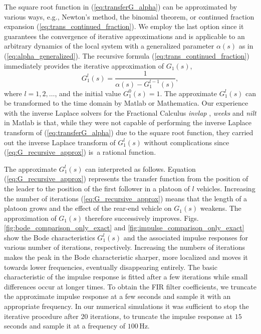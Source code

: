 \documentclass[final,5p,times,twocolumn]{elsarticle}
\begin{document}
The square root function in (\ref{eq:transferG_alpha}) can be approximated by various ways, e.g., Newton's method, the binomial theorem, or continued fraction expansion (\ref{eq:trans_continued_fraction}). We employ the last option since it guarantees the convergence of iterative approximations and is applicable to an arbitrary dynamics of the local system with a generalized parameter $\alpha(s)$ as in (\ref{eq:alpha_generalized}). The recursive formula (\ref{eq:trans_continued_fraction}) immediately provides the iterative approximation of $G_1(s)$,
\begin{equation}
  G_1^l(s) = \frac{1}{\alpha(s)-G_1^{l-1}(s)},
  \label{eq:G_recursive_approx}
\end{equation}
where $l = 1,2,\ldots $, and the initial value $G_1^0(s) = 1$. The approximate $G_1^l(s)$ can be transformed to the time domain by Matlab or Mathematica. Our experience with the inverse Laplace solvers for the Fractional Calculus \emph{invlap} \cite{dehoog1982}, \emph{weeks} \cite{Weeks1966} and \emph{nilt} \cite{brancik1999} in Matlab is that, while they were not capable of performing the inverse Laplace transform of (\ref{eq:transferG_alpha}) due to the square root function, they carried out the inverse Laplace transform of $G_{1}^l(s)$ without complications since (\ref{eq:G_recursive_approx}) is~a rational function.

The approximate $G_1^l(s)$ can interpreted as follows. Equation (\ref{eq:G_recursive_approx}) represents the transfer function from the position of the leader to the position of the first follower in a platoon of $l$ vehicles. Increasing the number of iterations (\ref{eq:G_recursive_approx}) means that the length of a platoon grows and the effect of the rear-end vehicle on $G_1(s)$ weakens. The approximation of $G_1(s)$ therefore successively improves. Figs. \ref{fig:bode_comparison_only_exact} and \ref{fig:impulse_comparison_only_exact} show the Bode characteristics $G_{1}^l(s)$ and the associated impulse responses for various number of iterations, respectively. Increasing the numbers of iterations makes the peak in the Bode characteristic sharper, more localized and moves it towards lower frequencies, eventually disappearing entirely. The basic characteristic of the impulse response is fitted after a few iterations while small differences occur at longer times. To obtain the FIR filter coefficients, we truncate the approximate impulse response at a few seconds and sample it with an appropriate frequency. In our numerical simulations it was sufficient to stop the iterative procedure after $20$ iterations, to truncate the impulse response at $15$ seconds and sample it at a frequency of $100\,\text{Hz}$.
\end{document}
